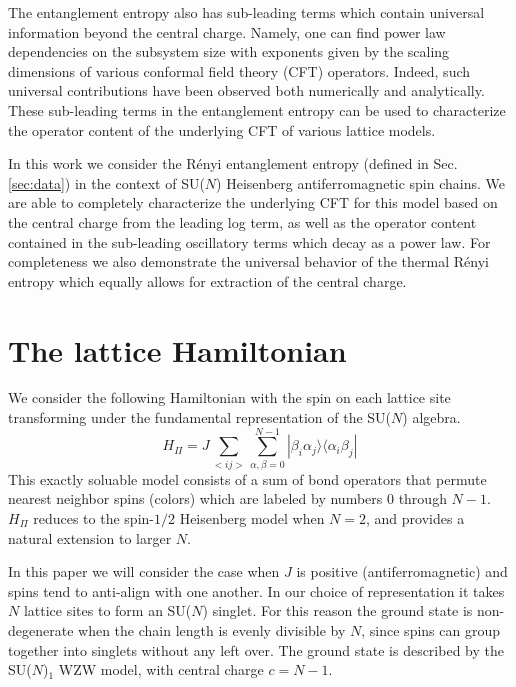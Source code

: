 \documentclass[aps,prb,reprint,floatfix]{revtex4-1}
\begin{document}
The entanglement entropy also has sub-leading terms which contain universal information beyond the central charge. Namely, one can find power law dependencies on the subsystem size with exponents given by the scaling dimensions of various conformal field theory (CFT) operators.\cite{Cardy2010:Unusual}  Indeed, such universal contributions have been observed both numerically\cite{laflorencie2006boundary,Calabrese2010:ParityEffects} and analytically.\cite{Fagotti2011:UniversalParity}  These sub-leading terms in the entanglement entropy can be used to characterize the operator content of the underlying CFT of various lattice models.\cite{Xavier2012:FiniteSizeCorrectionsEE, Xavier2011:ParitySpinS,Dalmonte2011:EstimatingOrder}  

In this work we consider the R\'{e}nyi entanglement entropy (defined in Sec. \ref{sec:data})  in the context of SU($N$) Heisenberg antiferromagnetic spin chains. We are able to completely characterize the underlying CFT for this model based on the central charge from the leading log term, as well as the operator content contained in the sub-leading oscillatory terms which decay as a power law.  For completeness we also demonstrate the universal behavior of the thermal R\'{e}nyi entropy which equally allows for extraction of the central charge.

\section{The lattice Hamiltonian} 


We consider the following Hamiltonian with the spin on each lattice site transforming under the fundamental representation of the SU($N$) algebra.  
{\allowdisplaybreaks
\begin{equation}
		H_{\Pi} = J\sum_{<ij>}\sum^{N-1}_{\alpha ,\beta =0} |\beta_{i}\alpha_{j}\rangle\langle\alpha_{i}\beta_{j}|
\label{eq:PermutationHamiltonian}
\end{equation}}
This exactly soluable model\cite{Sutherland1975:MulticompModel} consists of a sum of bond operators that permute nearest neighbor spins (colors) which are labeled by numbers 0 through $N-1$.  $H_\Pi$ reduces to the spin-$1/2$ Heisenberg model when $N=2$, and provides a natural extension to larger $N$.

In this paper we will consider the case when $J$ is positive (antiferromagnetic) and spins tend to anti-align with one another.  In our choice of representation it takes $N$ lattice sites to form an SU($N$) singlet.  For this reason the ground state is non-degenerate when the chain length is evenly divisible by $N$, since spins can group together into singlets without any left over.  The ground state is described by the SU($N$)$_{1}$ WZW model, with central charge $c=N-1$. \cite{Affleck1986:CriticalExpSUN,Affleck1988:CriticalSUN}
\end{document}
